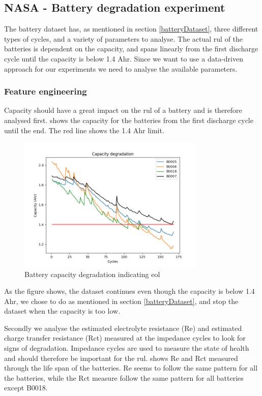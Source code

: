 \documentclass[english, a4paper]{report}
\begin{document}
{{        \subsection{NASA - Battery degradation experiment} \label{NASABatteryRegr}
        {
            The battery dataset has, as mentioned in section \ref{batteryDataset}, three different types of cycles, and a variety of parameters to analyse. The actual \acrfull{rul} of the batteries is dependent on the capacity, and spans linearly from the first discharge cycle until the capacity is below 1.4 Ahr. Since we want to use a data-driven approach for our experiments we need to analyse the available parameters.
            
            \subsubsection{Feature engineering}
            {
                Capacity should have a great impact on the \gls{rul} of a battery and is therefore analysed first.  shows the capacity for the batteries from the first discharge cycle until the end. The red line shows the 1.4 Ahr limit.
                
                \begin{figure}[H]
                    \centering \includegraphics[width=0.8\textwidth]{Battery-CapacityDegradation}
                    \caption{Battery capacity degradation indicating \gls{eol}}
                    \label{fig:CapacityDegradation}
                \end{figure}
                
                As the figure shows, the dataset continues even though the capacity is below 1.4 Ahr, we chose to do as mentioned in section \ref{batteryDataset}, and stop the dataset when the capacity is too low. 
                \par
                Secondly we analyse the estimated electrolyte resistance (Re) and estimated charge transfer resistance (Rct) measured at the impedance cycles to look for signs of degradation. Impedance cycles are used to measure the state of health and should therefore be important for the \gls{rul}.  shows Re and Rct measured through the life span of the batteries. Re seems to follow the same pattern for all the batteries, while the Rct measure follow the same pattern for all batteries except B0018.
                
}}}}
\end{document}
